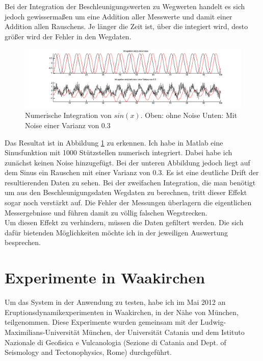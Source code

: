 \documentclass[12pt,a4paper]{scrartcl}
\begin{document}
Bei der Integration der Beschleunigungswerten zu Wegwerten handelt es sich jedoch gewissermaßen um eine Addition aller Messwerte und damit einer Addition allen Rauschens. Je länger die Zeit ist, über die integiert wird, desto größer wird der Fehler in den Wegdaten. 

\begin{figure}[htb]
\centering
\includegraphics[scale=.4]{sinusnoise.png}
\caption{Numerische Integration von $sin(x)$. Oben: ohne Noise Unten: Mit Noise einer Varianz von 0.3}
\label{sinusnoise}
\end{figure}

Das Resultat ist in Abbildung \ref{sinusnoise} zu erkennen. Ich habe in Matlab eine Sinusfunktion mit 1000 Stützstellen numerisch integriert. Dabei habe ich zunächst keinen Noise hinzugefügt. Bei der unteren Abbildung jedoch liegt auf dem Sinus ein Rauschen mit einer Varianz von $0.3$. Es ist eine deutliche Drift der resultierenden Daten zu sehen. Bei der zweifachen Integration, die man benötigt um aus den Beschleunigungsdaten Wegdaten zu berechnen, tritt dieser Effekt sogar noch verstärkt auf. Die Fehler der Messungen überlagern die eigentlichen Messergebnisse und führen damit zu völlig falschen Wegstrecken. \\

Um diesen Effekt zu verhindern, müssen die Daten gefiltert werden. Die sich dafür bietenden Möglichkeiten möchte ich in der jeweiligen Auswertung besprechen.

\newpage

\section{Experimente in Waakirchen}

Um das System in der Anwendung zu testen, habe ich im Mai 2012 an Eruptionsdynamikexperimenten in Waakirchen, in der Nähe von München, teilgenommen. Diese Experimente wurden gemeinsam mit der Ludwig-Maximilians-Universität München, der Universität Catania und dem Istituto Nazionale di Geofisica e Vulcanologia (Sezione di Catania and Dept. of Seismology and Tectonophysics, Rome) durchgeführt. 
\end{document}
